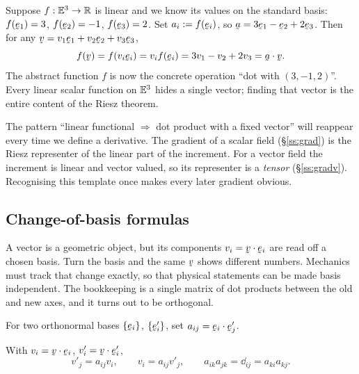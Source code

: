 \begin{example}\label{ex:riesz}
Suppose $f:\mathbb{E}^{3}\to\mathbb{R}$ is linear and we know its values on the standard
basis: $f(\be_{1})=3$, $f(\be_{2})=-1$, $f(\be_{3})=2$. Set
$a_{i}:=f(\be_{i})$, so $\ba=3\be_{1}-\be_{2}+2\be_{3}$. Then for any
$\bv=v_{1}\be_{1}+v_{2}\be_{2}+v_{3}\be_{3}$,
\[
f(\bv)=f(v_{i}\be_{i})=v_{i}f(\be_{i})=3v_{1}-v_{2}+2v_{3}=\ip\ba\bv.
\]
The abstract function $f$ is now the concrete operation ``dot with
$(3,-1,2)$''. Every linear scalar function on $\mathbb{E}^{3}$ hides a single vector;
finding that vector is the entire content of the Riesz theorem.
\end{example}

\begin{remark}\label{rem:rieszengine}
The pattern ``linear functional $\Rightarrow$ dot product with a fixed
vector'' will reappear every time we define a derivative. The gradient of
a scalar field (\S\ref{ss:grad}) is the Riesz representer of the linear
part of the increment. For a vector field the increment is linear and
vector valued, so its representer is a \emph{tensor} (\S\ref{ss:gradv}).
Recognising this template once makes every later gradient obvious.
\end{remark}

\subsection{Change-of-basis formulas}\label{ss:cob}

A vector is a geometric object, but its components $v_i=\ip\bv{\be_i}$ are
read off a chosen basis. Turn the basis and the same $\bv$ shows different
numbers. Mechanics must track that change exactly, so that physical
statements can be made basis independent. The bookkeeping is a single
matrix of dot products between the old and new axes, and it turns out to be
orthogonal.

\begin{definition}\label{def:dircos}
For two orthonormal bases $\{\be_{i}\}$, $\{\be'_{i}\}$, set
$a_{ij}=\ip{\be_{i}}{\be'_{j}}$.
\end{definition}

\begin{theorem}\label{thm:cob}
With $v_{i}=\ip\bv{\be_{i}}$, $v'_{i}=\ip\bv{\be'_{i}}$,
\[
v'_{j}=a_{ij}v_{i},\qquad v_{i}=a_{ij}v'_{j},\qquad
a_{ik}a_{jk}=\dd_{ij}=a_{ki}a_{kj}.
\]
\end{theorem}

